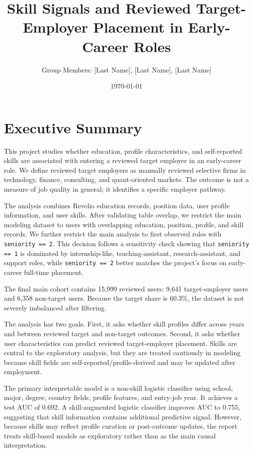 \documentclass[11pt]{article}
\title{\textbf{Skill Signals and Reviewed Target-Employer Placement in Early-Career Roles}}
\author{Group Members: [Last Name], [Last Name], [Last Name]}
\date{\today}
\begin{document}
\maketitle

\section*{Executive Summary}

This project studies whether education, profile characteristics, and self-reported skills are associated with entering a reviewed target employer in an early-career role. We define reviewed target employers as manually reviewed selective firms in technology, finance, consulting, and quant-oriented markets. The outcome is not a measure of job quality in general; it identifies a specific employer pathway.

The analysis combines Revelio education records, position data, user profile information, and user skills. After validating table overlap, we restrict the main modeling dataset to users with overlapping education, position, profile, and skill records. We further restrict the main analysis to first observed roles with \texttt{seniority == 2}. This decision follows a sensitivity check showing that \texttt{seniority == 1} is dominated by internship-like, teaching-assistant, research-assistant, and support roles, while \texttt{seniority == 2} better matches the project's focus on early-career full-time placement.

The final main cohort contains 15,999 reviewed users: 9,641 target-employer users and 6,358 non-target users. Because the target share is 60.3\%, the dataset is not severely imbalanced after filtering.

The analysis has two goals. First, it asks whether skill profiles differ across years and between reviewed target and non-target outcomes. Second, it asks whether user characteristics can predict reviewed target-employer placement. Skills are central to the exploratory analysis, but they are treated cautiously in modeling because skill fields are self-reported/profile-derived and may be updated after employment.

The primary interpretable model is a non-skill logistic classifier using school, major, degree, country fields, profile features, and entry-job year. It achieves a test AUC of 0.692. A skill-augmented logistic classifier improves AUC to 0.755, suggesting that skill information contains additional predictive signal. However, because skills may reflect profile curation or post-outcome updates, the report treats skill-based models as exploratory rather than as the main causal interpretation.
\end{document}
